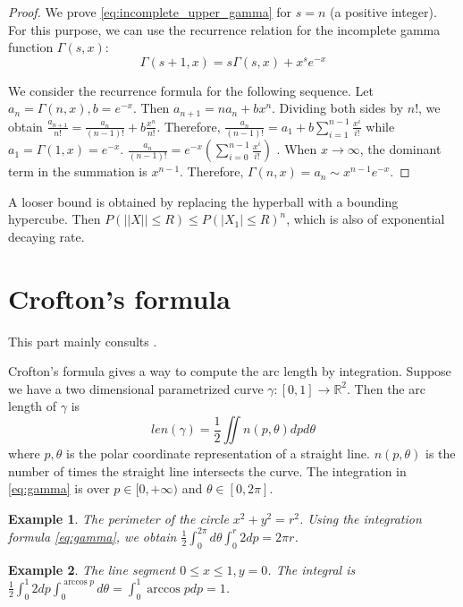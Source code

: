 \documentclass{article}
\newtheorem{example}{Example}
\begin{document}
\begin{proof}
    We prove \eqref{eq:incomplete_upper_gamma}
    for $s=n$ (a positive integer).
For this purpose,
we can use the recurrence relation for the
incomplete gamma function $\Gamma(s,x)$:
\begin{equation}
    \Gamma(s+1, x)
    = s\Gamma(s, x) + x^s e^{-x}
\end{equation}

We consider the recurrence formula for the
following sequence. Let $a_{n}=\Gamma(n, x),
b=e^{-x}$.
Then $a_{n+1} = n a_n + bx^n$.
Dividing both sides by $n!$, we obtain
$\frac{a_{n+1}}{n!} =
\frac{a_n}{(n-1)!} + b\frac{x^n}{n!}$.
Therefore, $\frac{a_n}{(n-1)!} = a_1 + b\sum_{i=1}^{n-1}
\frac{x^i}{i!}$ while $a_1 = \Gamma(1, x)
=e^{-x}$.
$\frac{a_n}{(n-1)!} = e^{-x}
(\sum_{i=0}^{n-1} \frac{x^i}{i!})$
.
When $x\to \infty$, the dominant term
in the summation is $x^{n-1}$. Therefore,
$\Gamma(n,x) = a_n \sim x^{n-1} e^{-x}$.

\end{proof}

A looser bound is obtained by replacing the hyperball
with a bounding hypercube. Then
$P(||X||\leq R) \leq P(|X_1|\leq R)^n$, which is also of
exponential decaying rate.

\section{Crofton's formula}
This part mainly consults \cite{crofton}.

Crofton's formula gives a way to compute the arc length
by integration. Suppose we have a two dimensional
parametrized curve $\gamma: [0, 1] \to \mathbb{R}^2$.
Then the arc length of $\gamma$ is
\begin{equation}\label{eq:gamma}
    len(\gamma) = \frac{1}{2}\iint n(p, \theta)
    dp d\theta
\end{equation}
where $p, \theta$ is the polar coordinate representation
of a straight line. $n(p, \theta)$ is the number of times the 
straight line intersects the curve. The integration
in \eqref{eq:gamma} is over $p\in [0, +\infty)$
and $\theta \in [0, 2\pi]$.
\begin{example}
    The perimeter of the circle $x^2+y^2=r^2$.
    Using the integration formula \eqref{eq:gamma},
    we obtain $\frac{1}{2}\int_{0}^{2\pi} d\theta \int_0^r 2 dp=2\pi r$.
\end{example}
\begin{example}
    The line segment $0\leq x \leq 1, y=0$.
    The integral is $\frac{1}{2}\int_0^1 2 dp
    \int_0^{\arccos p} d\theta =
    \int_0^1 \arccos p dp=1$.
\end{example}


\end{document}
